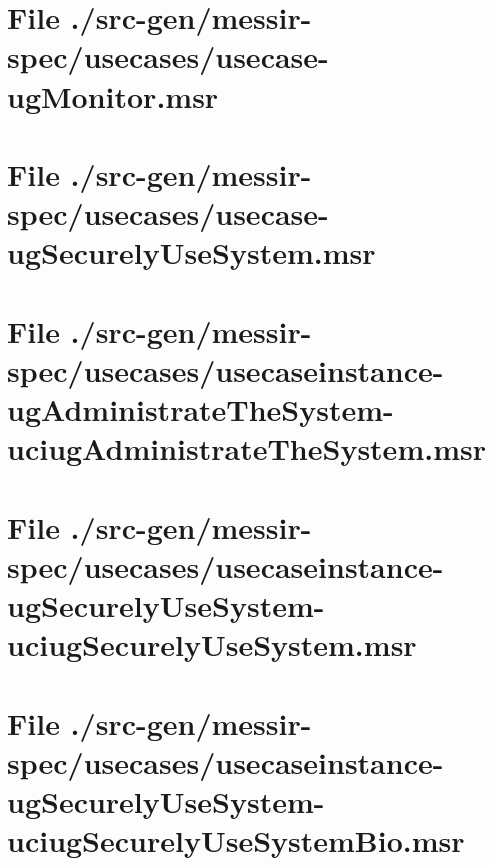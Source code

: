\section[File /src-gen/messir-spec/usecases/usecase-ugMonitor.msr]{File ./src-gen/messir-spec/usecases/usecase-ugMonitor.msr}
\scriptsize

\normalsize
	
\section[File /src-gen/messir-spec/usecases/usecase-ugSecurelyUseSystem.msr]{File ./src-gen/messir-spec/usecases/usecase-ugSecurelyUseSystem.msr}
\scriptsize

\normalsize
	
\section[File /.../usecaseinstance-ugAdministrateTheSystem-uciugAdministrateTheSystem.msr]{File ./src-gen/messir-spec/usecases/usecaseinstance-ugAdministrateTheSystem-uciugAdministrateTheSystem.msr}
\scriptsize

\normalsize
	
\section[File /src-gen.../usecaseinstance-ugSecurelyUseSystem-uciugSecurelyUseSystem.msr]{File ./src-gen/messir-spec/usecases/usecaseinstance-ugSecurelyUseSystem-uciugSecurelyUseSystem.msr}
\scriptsize

\normalsize
	
\section[File /.../usecaseinstance-ugSecurelyUseSystem-uciugSecurelyUseSystemBio.msr]{File ./src-gen/messir-spec/usecases/usecaseinstance-ugSecurelyUseSystem-uciugSecurelyUseSystemBio.msr}
\scriptsize

\normalsize
	

